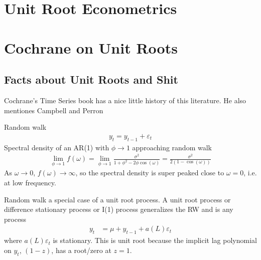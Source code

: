 \documentclass[12pt]{article}
\theoremstyle{plain}
\theoremstyle{definition}
\theoremstyle{remark}
\newcommand{\ra}{\rightarrow}
\begin{document}





\clearpage
\section{Unit Root Econometrics}






\clearpage
\section{Cochrane on Unit Roots}

\subsection{Facts about Unit Roots and Shit}

Cochrane's Time Series book has a nice little history of this
literature. He also mentiones Campbell and Perron

Random walk
\begin{align}
  y_t = y_{t-1} + \varepsilon_t
  \label{rw}
\end{align}
Spectral density of an AR(1) with $\phi\ra 1$ approaching random walk
\begin{align*}
  \lim_{\phi\ra 1}f(\omega)
  =
  \lim_{\phi\ra 1}
  \frac{\sigma^2}{1+\phi^2-2\phi \cos(\omega)}
  =
  \frac{\sigma^2}{2(1-\cos(\omega))}
\end{align*}
As $\omega\ra 0$, $f(\omega)\ra \infty$, so the spectral density is
super peaked close to $\omega=0$, i.e. at low frequency.

Random walk a special case of a unit root process. A unit root process
or difference stationary process or I(1) process generalizes the RW and
is any process
\begin{align}
  y_t &= \mu + y_{t-1} + a(L)\varepsilon_t
  \label{I1}
\end{align}
where $a(L)\varepsilon_t$ is stationary.
This is unit root because the implicit lag polynomial on $y_t$,
$(1-z)$, has a root/zero at $z=1$.
\end{document}
